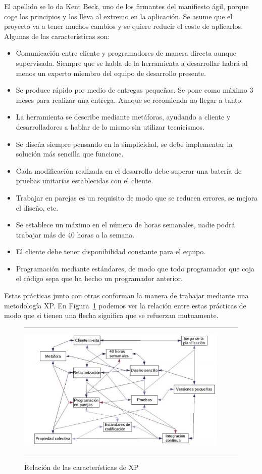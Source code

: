 El apellido  se lo da Kent Beck, uno de los firmantes del
manifiesto ágil, porque coge los principios y los lleva al extremo en
la aplicación. Se asume que el proyecto va a tener muchos cambios y se
quiere reducir el coste de aplicarlos. Algunas de las características
son:
\begin{itemize}
\item Comunicación entre cliente y programadores de manera directa
  aunque supervisada. Siempre que se habla de la herramienta a
  desarrollar habrá al menos un experto miembro del equipo de
  desarrollo presente.
\item Se produce rápido por medio de entregas pequeñas. Se pone como
  máximo 3 meses para realizar una entrega. Aunque se recomienda no
  llegar a tanto.
\item La herramienta se describe mediante metáforas, ayudando a
  cliente y desarrolladores a hablar de lo mismo sin utilizar
  tecnicismos.
\item Se diseña siempre pensando en la simplicidad, se debe
  implementar la solución más sencilla que funcione.
\item Cada modificación realizada en el desarrollo debe superar una
  batería de pruebas unitarias establecidas con el cliente.
\item Trabajar en parejas es un requisito de modo que se reducen
  errores, se mejora el diseño, etc.
\item Se establece un máximo en el número de horas semanales, nadie
  podrá trabajar más de 40 horas a la semana.
\item El cliente debe tener disponibilidad constante para el equipo.
\item Programación mediante estándares, de modo que todo programador
  que coja el código sepa que ha hecho un programador anterior.
\end{itemize}
Estas prácticas junto con otras conforman la manera de trabajar
mediante una metodología XP. En Figura~\ref{fig:xp} podemos ver la
relación entre estas prácticas de modo que si tienen una flecha
significa que se refuerzan mutuamente.


\begin{figure}[h]
\hrule\smallskip
\begin{center}
\includegraphics[width=0.9\textwidth]{fig/xp.png}
\end{center}
\caption{Relación de las características de XP}
\label{fig:xp}
\hrule
\end{figure}


